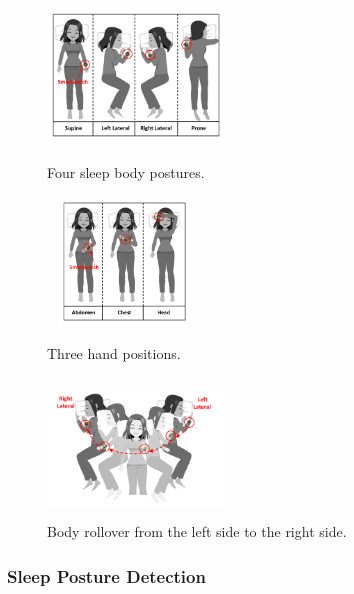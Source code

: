 \begin{figure}[!t]
	\centering
	\begin{minipage}[t]{.33\textwidth}
		\centering
		  \includegraphics[width=4.7cm,height=3.7cm]{Figures/BodyPosture.pdf}
		\caption{Four sleep body postures.}
		\label{fig:BodyPosture}
	\end{minipage}%
	\begin{minipage}[t]{.33\textwidth}
		\centering
		\includegraphics[width=4.1cm,height=3.4cm]{Figures/HandPosition.pdf}
		\caption{Three hand positions.}
		\label{fig:HandPosition}		
	\end{minipage}
\begin{minipage}[t]{.33\textwidth}
		\centering
	\includegraphics[width=4.7cm,height=3.7cm]{Figures/BodyRollover.pdf}
	\caption{Body rollover from the left side to the right side.}
	\label{fig:BodyRollover}
\end{minipage}
\end{figure}



\subsubsection{Sleep Posture Detection}\label{sec:sleeppdet}

